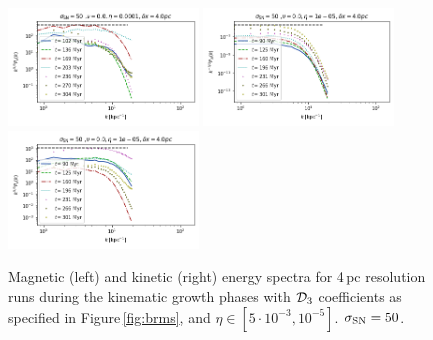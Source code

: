 \documentclass[iop,apj,numberedappendix,twocolappendix]{emulateapj}
\begin{document}
\begin{figure}
\includegraphics[trim=0.0cm 0.00cm 0.0cm 0.0cm,clip=true,width=0.45\textwidth]{csc_figs/4pcPm0e-4_0kpower.png}
\includegraphics[trim=0.0cm 0.00cm 0.0cm 0.0cm,clip=true,width=0.45\textwidth]{csc_figs/4pcPm0e-5_0Bpower.png}
\includegraphics[trim=0.0cm 0.00cm 0.0cm 0.0cm,clip=true,width=0.45\textwidth]{csc_figs/4pcPm0e-5_0kpower.png}
\caption{
Magnetic (left) and kinetic (right) energy spectra for 4\,pc resolution runs 
during the kinematic growth phases with ${\cal D}_3$ 
coefficients as specified in Figure\,\ref{fig:brms}, and $\eta\in[5\cdot10^{-3},10^{-5}]$. $\sigma_{\rm SN}=50$.
\label{fig:4spectraRm}
}
\end{figure}
\end{document}
